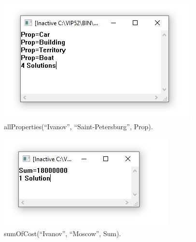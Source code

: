 \begin{figure}[H]
    \centering
    \includegraphics[scale=1]{img/2.png}
    \caption{allProperties(``Ivanov'', ``Saint-Petersburg'', Prop).}
\end{figure}

\begin{figure}[H]
    \centering
    \includegraphics[scale=1]{img/3.png}
    \caption{sumOfCost(``Ivanov'', ``Moscow'', Sum).}
\end{figure}
